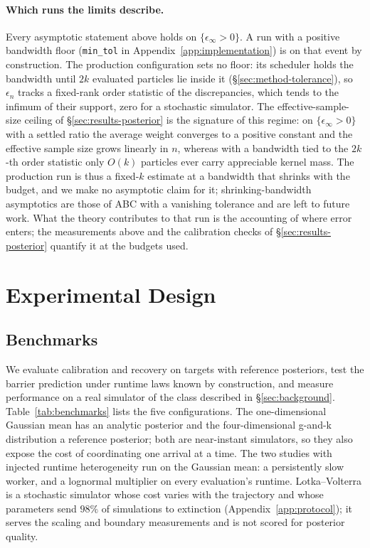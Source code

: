\documentclass[10pt]{article}
\theoremstyle{plain}
\theoremstyle{definition}
\begin{document}
\paragraph{Which runs the limits describe.} Every asymptotic statement above holds on $\{\epsilon_\infty>0\}$. A run with a positive bandwidth floor (\texttt{min\_tol} in Appendix~\ref{app:implementation}) is on that event by construction. The production configuration sets no floor: its scheduler holds the bandwidth until $2k$ evaluated particles lie inside it (\S\ref{sec:method-tolerance}), so $\epsilon_n$ tracks a fixed-rank order statistic of the discrepancies, which tends to the infimum of their support, zero for a stochastic simulator. The effective-sample-size ceiling of \S\ref{sec:results-posterior} is the signature of this regime: on $\{\epsilon_\infty>0\}$ with a settled ratio the average weight converges to a positive constant and the effective sample size grows linearly in $n$, whereas with a bandwidth tied to the $2k$-th order statistic only $O(k)$ particles ever carry appreciable kernel mass. The production run is thus a fixed-$k$ estimate at a bandwidth that shrinks with the budget, and we make no asymptotic claim for it; shrinking-bandwidth asymptotics are those of ABC with a vanishing tolerance and are left to future work. What the theory contributes to that run is the accounting of where error enters; the measurements above and the calibration checks of \S\ref{sec:results-posterior} quantify it at the budgets used.

\section{Experimental Design}\label{sec:experiments}

\subsection{Benchmarks}\label{sec:experiments-suite}
We evaluate calibration and recovery on targets with reference posteriors, test the barrier prediction under runtime laws known by construction, and measure performance on a real simulator of the class described in \S\ref{sec:background}. Table~\ref{tab:benchmarks} lists the five configurations. The one-dimensional Gaussian mean has an analytic posterior and the four-dimensional g-and-k distribution \citep{rayner2002gk} a reference posterior; both are near-instant simulators, so they also expose the cost of coordinating one arrival at a time. The two studies with injected runtime heterogeneity run on the Gaussian mean: a persistently slow worker, and a lognormal multiplier on every evaluation's runtime. Lotka--Volterra is a stochastic simulator whose cost varies with the trajectory and whose parameters send $98\%$ of simulations to extinction (Appendix~\ref{app:protocol}); it serves the scaling and boundary measurements and is not scored for posterior quality.
\end{document}
